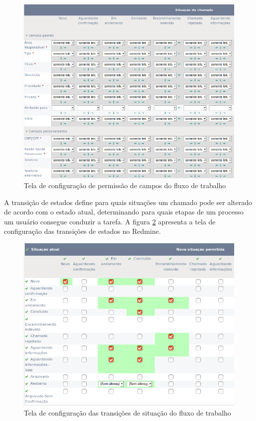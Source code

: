 \begin{figure}[H]
  \centering
  \includegraphics[width=1.0\textwidth]{imagens/workflow_fields.png}
  \caption{Tela de configuração de permissão de campos do fluxo de trabalho}
  \label{fig:redmine_campos}
\end{figure}

A transição de estados define para quais situações um chamado pode ser alterado de acordo com o estado atual, determinando para quais etapas de um processo um usuário consegue conduzir a tarefa. A figura \ref{fig:redmine_transicoes} apresenta a tela de configuração das transições de estados no Redmine.

\begin{figure}[H]
  \centering
  \includegraphics[width=1.0\textwidth]{imagens/workflow_status.png}
  \caption{Tela de configuração das transições de situação do fluxo de trabalho}
  \label{fig:redmine_transicoes}
\end{figure}

